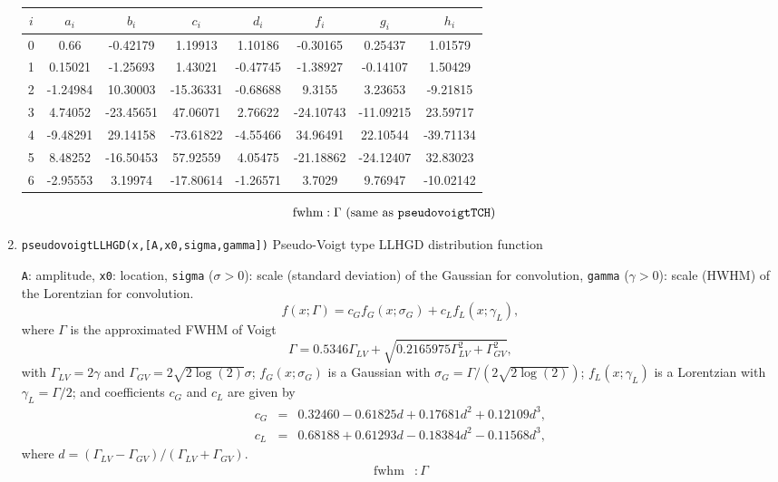 \documentclass[reprint,showpacs,prb,nofootinbib,amsmath,amssymb]{revtex4-1}
\begin{document}
\begin{enumerate}
\begin{widetext}
\begin{center}
\begin{tabular}{cccccccc}
	\hline
	$i$ & $a_i$ 	& $b_i$ 	& $c_i$ 	& $d_i$ 	& $f_i$ 	& $g_i$ 	& $h_i$ 	\\
	\hline
	0 	& 0.66 		& -0.42179	& 1.19913   & 1.10186   & -0.30165	& 0.25437   & 1.01579 	\\
    1   & 0.15021   & -1.25693	& 1.43021   & -0.47745	& -1.38927	& -0.14107	& 1.50429 	\\
	2 	& -1.24984	& 10.30003	& -15.36331	& -0.68688	& 9.3155    & 3.23653   & -9.21815 	\\
	3 	& 4.74052   & -23.45651	& 47.06071	& 2.76622   & -24.10743	& -11.09215	& 23.59717 	\\
	4 	& -9.48291	& 29.14158	& -73.61822	& -4.55466	& 34.96491	& 22.10544	& -39.71134 \\
	5 	& 8.48252   & -16.50453	& 57.92559	& 4.05475   & -21.18862	& -24.12407	& 32.83023 	\\
	6 	& -2.95553	& 3.19974   & -17.80614	& -1.26571	& 3.7029    & 9.76947   & -10.02142	\\
	\hline
\end{tabular}
\end{center}
\end{widetext}
\begin{align}
		\mbox{fwhm} &: \mbox{$\Gamma$ (same as \texttt{pseudovoigtTCH})}  \nonumber
\end{align}

\item \verb|pseudovoigtLLHGD(x,[A,x0,sigma,gamma])| Pseudo-Voigt type LLHGD distribution function~\cite{pseudovoigtLLHGD}

\verb|A|: amplitude, \verb|x0|: location, \verb|sigma| ($\sigma>0$): scale (standard deviation) of the Gaussian for convolution, \verb|gamma| ($\gamma>0$): scale (HWHM) of the Lorentzian for convolution.
\begin{equation}
f(x;\Gamma)=c_G f_G(x;\sigma_G)+c_L f_L(x;\gamma_L), \nonumber
\end{equation}
where $\Gamma$ is the approximated FWHM of Voigt~\cite{olivero} 
\begin{equation}
\Gamma = 0.5346\Gamma_{LV}+\sqrt{0.2165975\Gamma_{LV}^2+\Gamma_{GV}^2}, \nonumber
\end{equation}
with $\Gamma_{LV}=2\gamma$ and $\Gamma_{GV}=2\sqrt{2\log(2)}\sigma$; $f_G(x;\sigma_G)$ is a Gaussian with $\sigma_G=\Gamma/(2\sqrt{2\log(2)})$; $f_L(x;\gamma_L)$ is a Lorentzian with $\gamma_L=\Gamma/2$; and coefficients $c_G$ and $c_L$ are given by
\begin{eqnarray}
c_G &=& 0.32460 - 0.61825d + 0.17681d^2 + 0.12109d^3, \nonumber \\
c_L &=& 0.68188 + 0.61293d - 0.18384d^2 - 0.11568d^3, \nonumber
\end{eqnarray}
where $d=(\Gamma_{LV}-\Gamma_{GV})/(\Gamma_{LV}+\Gamma_{GV})$.
\begin{align}
	\mbox{fwhm} &: \mbox{$\Gamma$}  \nonumber
\end{align}


\end{enumerate}
\end{document}
